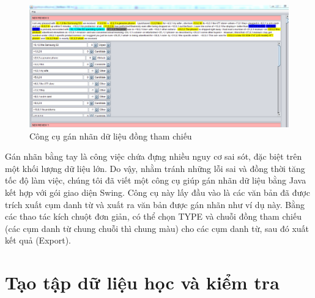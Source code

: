 \documentclass[12pt]{report}
\begin{document}
				\begin{figure}[H]
					\centering							
					\indent\includegraphics[scale=0.45]{images/markup_tool}				
					\caption{Công cụ gán nhãn dữ liệu đồng tham chiếu}	
				\end{figure}				

				\par Gán nhãn bằng tay là công việc chứa đựng nhiều nguy cơ sai sót, đặc biệt trên một khối lượng dữ liệu lớn. Do vậy, nhằm tránh những lỗi sai và đồng thời tăng tốc độ làm việc, chúng tôi đã viết một công cụ giúp gán nhãn dữ liệu bằng Java kết hợp với gói giao diện Swing. Công cụ này lấy đầu vào là các văn bản đã được trích xuất cụm danh từ và xuất ra văn bản được gán nhãn như ví dụ này. Bằng các thao tác kích chuột đơn giản, có thể chọn TYPE và chuỗi đồng tham chiếu (các cụm danh từ chung chuỗi thì chung màu) cho các cụm danh từ, sau đó xuất kết quả (Export).
		
		\section{Tạo tập dữ liệu học và kiểm tra}
\end{document}
